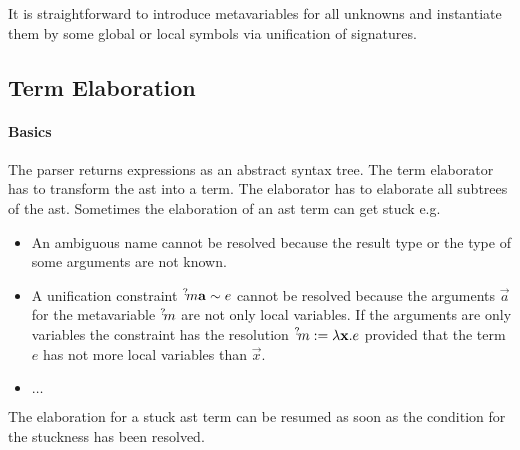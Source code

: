 It is straightforward to introduce metavariables for all unknowns and
instantiate them by some global or local symbols via unification of signatures.







\subsection{Term Elaboration}

\begin{comment}
    auxialiary terms: (context, term, type), ...

    For each subterm a hole. A hole is a metavariable.
        Hole:
            Context
            required signature + opt. required type or supertype
            opt (term, type) if filled.

    Signature metavariables (for the unknowns). Instantiated by signature
    unification.
\end{comment}




\paragraph{Basics}

The parser returns expressions as an abstract syntax tree. The term elaborator
has to transform the ast into a  term. The elaborator has to elaborate all
subtrees of the ast. Sometimes the elaboration of an ast term can get stuck e.g.
\begin{itemize}
    \item An ambiguous name cannot be resolved because the result type or the
        type of some arguments are not known.

    \item A unification constraint ${{}^? \kern-0.2em m} {\mathbf a} \sim e$ cannot be resolved
        because the arguments $\vec a$ for the metavariable ${{}^? \kern-0.2em m}$ are not
        only local variables. If the arguments are only variables the constraint
        has the resolution ${{}^? \kern-0.2em m} := \lambda {\mathbf x}. e$ provided that the term
        $e$ has not more local variables than $\vec x$.

    \item $\ldots$
\end{itemize}

The elaboration for a stuck ast term can be resumed as soon as the condition for
the stuckness has been resolved.

